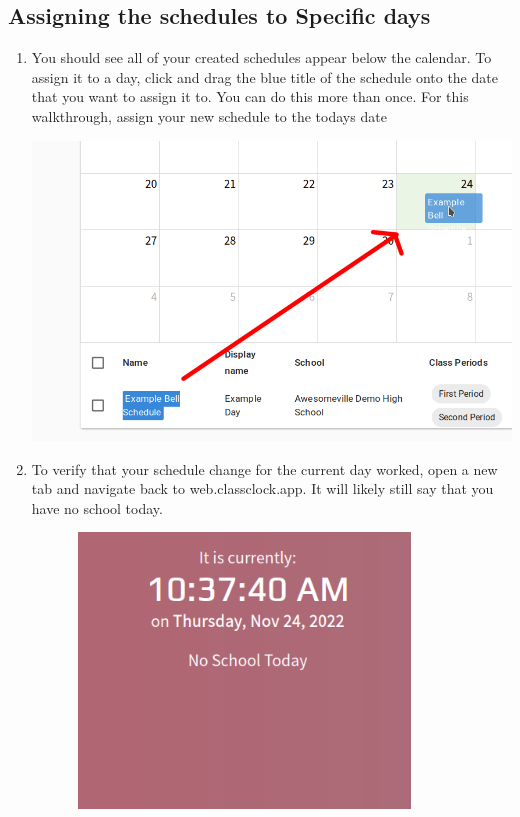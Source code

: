 \documentclass{article}
\begin{document}
\subsection{Assigning the schedules to Specific days}
\begin{enumerate}
\item {You should see all of your created schedules appear below the calendar. To assign it to a day, click and drag the blue
title of the schedule onto the date that you want to assign it to. You can do this more than once. For this
walkthrough, assign your new schedule to the todays date\newline
}
\begin{center}
\includegraphics[width=\textwidth]{Mini20Manual-img012.png}
\end{center}
\item {To verify that your schedule change for the current day worked, open a new tab and navigate back to web.classclock.app.
It will likely still say that you have no school today.}
\begin{center}
\includegraphics[width=4.4366in,height=2.8764in]{Mini20Manual-img013.png}

\end{center}
\end{enumerate}
\end{document}

